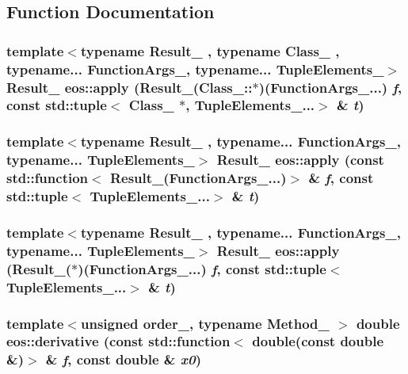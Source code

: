 \subsection{Function Documentation}
\hypertarget{namespaceeos_a05333558aad48dbab3da261c54e3282d}{
\subsubsection[{apply}]{\setlength{\rightskip}{0pt plus 5cm}template$<$typename Result\_\- , typename Class\_\- , typename... FunctionArgs\_\-, typename... TupleElements\_\-$>$ Result\_\- eos::apply (Result\_\-(Class\_\-::$\ast$)(FunctionArgs\_\-...) {\em f}, \/  const std::tuple$<$ Class\_\- $\ast$, TupleElements\_\-...$>$ \& {\em t})}}
\label{namespaceeos_a05333558aad48dbab3da261c54e3282d}
\hypertarget{namespaceeos_a56ba31c6e8b9cd9a310e2df15220d202}{
\subsubsection[{apply}]{\setlength{\rightskip}{0pt plus 5cm}template$<$typename Result\_\- , typename... FunctionArgs\_\-, typename... TupleElements\_\-$>$ Result\_\- eos::apply (const std::function$<$ Result\_\-(FunctionArgs\_\-...)$>$ \& {\em f}, \/  const std::tuple$<$ TupleElements\_\-...$>$ \& {\em t})}}
\label{namespaceeos_a56ba31c6e8b9cd9a310e2df15220d202}
\hypertarget{namespaceeos_a6d6ca72f35614029a62c270ec042d80c}{
\subsubsection[{apply}]{\setlength{\rightskip}{0pt plus 5cm}template$<$typename Result\_\- , typename... FunctionArgs\_\-, typename... TupleElements\_\-$>$ Result\_\- eos::apply (Result\_\-($\ast$)(FunctionArgs\_\-...) {\em f}, \/  const std::tuple$<$ TupleElements\_\-...$>$ \& {\em t})}}
\label{namespaceeos_a6d6ca72f35614029a62c270ec042d80c}
\hypertarget{namespaceeos_af951dd2b07bb6381c7529bc0558a629a}{
\subsubsection[{derivative}]{\setlength{\rightskip}{0pt plus 5cm}template$<$unsigned order\_\-, typename Method\_\- $>$ double eos::derivative (const std::function$<$ double(const double \&)$>$ \& {\em f}, \/  const double \& {\em x0})}}
